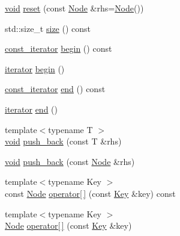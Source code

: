\begin{DoxyCompactItemize}
\item 
\mbox{\hyperlink{glad_8h_a950fc91edb4504f62f1c577bf4727c29}{void}} \mbox{\hyperlink{class_y_a_m_l_1_1_node_ae9511d64500c0be6eeda5a9b969325ac}{reset}} (const \mbox{\hyperlink{class_y_a_m_l_1_1_node}{Node}} \&rhs=\mbox{\hyperlink{class_y_a_m_l_1_1_node}{Node}}())
\item 
std\+::size\+\_\+t \mbox{\hyperlink{class_y_a_m_l_1_1_node_ae843efe9fc5933f7adec123661c73c16}{size}} () const
\item 
\mbox{\hyperlink{class_y_a_m_l_1_1_node_a40d235ac56001961929189a33c923d6c}{const\+\_\+iterator}} \mbox{\hyperlink{class_y_a_m_l_1_1_node_abad00d4117dce1ce60e6c83963d74dd1}{begin}} () const
\item 
\mbox{\hyperlink{class_y_a_m_l_1_1_node_a3004302ddd5d977af0a6da29af38f7f4}{iterator}} \mbox{\hyperlink{class_y_a_m_l_1_1_node_ac249a75c8d917a230c126ffd0585953a}{begin}} ()
\item 
\mbox{\hyperlink{class_y_a_m_l_1_1_node_a40d235ac56001961929189a33c923d6c}{const\+\_\+iterator}} \mbox{\hyperlink{class_y_a_m_l_1_1_node_a552f8a322701be4601ff268e1c2b67e7}{end}} () const
\item 
\mbox{\hyperlink{class_y_a_m_l_1_1_node_a3004302ddd5d977af0a6da29af38f7f4}{iterator}} \mbox{\hyperlink{class_y_a_m_l_1_1_node_a703a31bfe6f54c773c8688e6c924d9ed}{end}} ()
\item 
{\footnotesize template$<$typename T $>$ }\\\mbox{\hyperlink{glad_8h_a950fc91edb4504f62f1c577bf4727c29}{void}} \mbox{\hyperlink{class_y_a_m_l_1_1_node_a9ba45abe5334123051997c5de5d92e5a}{push\+\_\+back}} (const T \&rhs)
\item 
\mbox{\hyperlink{glad_8h_a950fc91edb4504f62f1c577bf4727c29}{void}} \mbox{\hyperlink{class_y_a_m_l_1_1_node_a619341edc51fadf84fd7e9a34699c210}{push\+\_\+back}} (const \mbox{\hyperlink{class_y_a_m_l_1_1_node}{Node}} \&rhs)
\item 
{\footnotesize template$<$typename Key $>$ }\\const \mbox{\hyperlink{class_y_a_m_l_1_1_node}{Node}} \mbox{\hyperlink{class_y_a_m_l_1_1_node_a2795774c0fe459793ea3c6b0ae2e740b}{operator\mbox{[}$\,$\mbox{]}}} (const \mbox{\hyperlink{namespace_y_a_m_l_a67c320aa50d3de7ecba1d0b8775dd684a1af533fc24b0311b8c4d5ac2870283aa}{Key}} \&key) const
\item 
{\footnotesize template$<$typename Key $>$ }\\\mbox{\hyperlink{class_y_a_m_l_1_1_node}{Node}} \mbox{\hyperlink{class_y_a_m_l_1_1_node_af2123f5a45029366e0fa6fb75e13d1f4}{operator\mbox{[}$\,$\mbox{]}}} (const \mbox{\hyperlink{namespace_y_a_m_l_a67c320aa50d3de7ecba1d0b8775dd684a1af533fc24b0311b8c4d5ac2870283aa}{Key}} \&key)

\end{DoxyCompactItemize}
